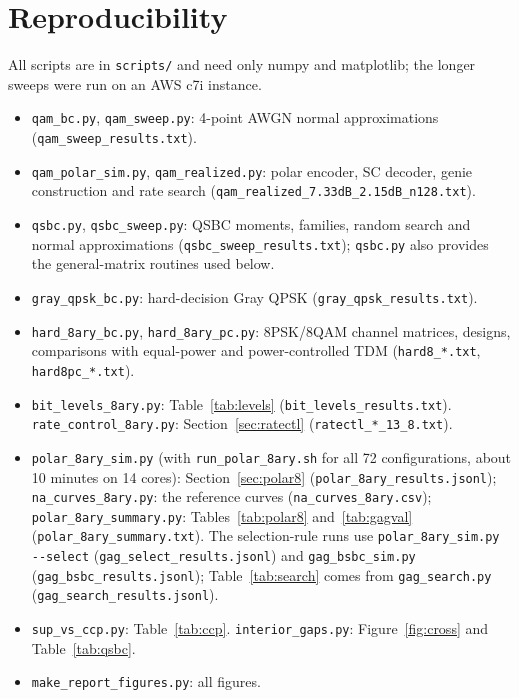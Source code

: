 \documentclass[11pt]{article}
\begin{document}
\section{Reproducibility}
All scripts are in \texttt{scripts/} and need only numpy and matplotlib; the longer sweeps were run on an AWS c7i instance.
\begin{itemize}
\item \texttt{qam\_bc.py}, \texttt{qam\_sweep.py}: 4-point AWGN normal approximations (\texttt{qam\_sweep\_results.txt}).
\item \texttt{qam\_polar\_sim.py}, \texttt{qam\_realized.py}: polar encoder, SC decoder, genie construction and rate search (\texttt{qam\_realized\_7.33dB\_2.15dB\_n128.txt}).
\item \texttt{qsbc.py}, \texttt{qsbc\_sweep.py}: QSBC moments, families, random search and normal approximations (\texttt{qsbc\_sweep\_results.txt}); \texttt{qsbc.py} also provides the general-matrix routines used below.
\item \texttt{gray\_qpsk\_bc.py}: hard-decision Gray QPSK (\texttt{gray\_qpsk\_results.txt}).
\item \texttt{hard\_8ary\_bc.py}, \texttt{hard\_8ary\_pc.py}: 8PSK/8QAM channel matrices, designs, comparisons with equal-power and power-controlled TDM (\texttt{hard8\_*.txt}, \texttt{hard8pc\_*.txt}).
\item \texttt{bit\_levels\_8ary.py}: Table~\ref{tab:levels} (\texttt{bit\_levels\_results.txt}). \texttt{rate\_control\_8ary.py}: Section~\ref{sec:ratectl} (\texttt{ratectl\_*\_13\_8.txt}).
\item \texttt{polar\_8ary\_sim.py} (with \texttt{run\_polar\_8ary.sh} for all 72 configurations, about 10 minutes on 14 cores): Section~\ref{sec:polar8} (\texttt{polar\_8ary\_results.jsonl}); \texttt{na\_curves\_8ary.py}: the reference curves (\texttt{na\_curves\_8ary.csv}); \texttt{polar\_8ary\_summary.py}: Tables~\ref{tab:polar8} and~\ref{tab:gagval} (\texttt{polar\_8ary\_summary.txt}). The selection-rule runs use \texttt{polar\_8ary\_sim.py -{}-select} (\texttt{gag\_select\_results.jsonl}) and \texttt{gag\_bsbc\_sim.py} (\texttt{gag\_bsbc\_results.jsonl}); Table~\ref{tab:search} comes from \texttt{gag\_search.py} (\texttt{gag\_search\_results.jsonl}).
\item \texttt{sup\_vs\_ccp.py}: Table~\ref{tab:ccp}. \texttt{interior\_gaps.py}: Figure~\ref{fig:cross} and Table~\ref{tab:qsbc}.
\item \texttt{make\_report\_figures.py}: all figures.
\end{itemize}



\end{document}
